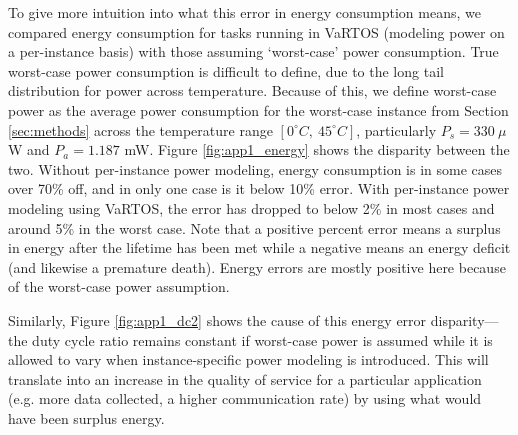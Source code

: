 To give more intuition into what this error in energy consumption means, we compared energy consumption for tasks running in VaRTOS (modeling power on a per-instance basis) with those assuming `worst-case' power consumption.  True worst-case power consumption is difficult to define, due to the long tail distribution for power across temperature.  Because of this, we define worst-case power as the average power consumption for the worst-case instance from Section \ref{sec:methods} across the temperature range $[0^\circ C,~45^\circ C]$, particularly $P_s = 330 ~\mu$W and $P_a = 1.187$ mW.  Figure \ref{fig:app1_energy} shows the disparity between the two.  Without per-instance power modeling, energy consumption is in some cases over 70\% off, and in only one case is it below 10\% error.  With per-instance power modeling using VaRTOS, the error has dropped to below 2\% in most cases and around 5\% in the worst case. Note that a positive percent error means a surplus in energy after the lifetime has been met while a negative means an energy deficit (and likewise a premature death).  Energy errors are mostly positive here because of the worst-case power assumption. 

Similarly, Figure \ref{fig:app1_dc2} shows the cause of this energy error disparity---the duty cycle ratio remains constant if worst-case power is assumed while it is allowed to vary when instance-specific power modeling is introduced.  This will translate into an increase in the quality of service for a particular application (e.g. more data collected, a higher communication rate) by using what would have been surplus energy. 

